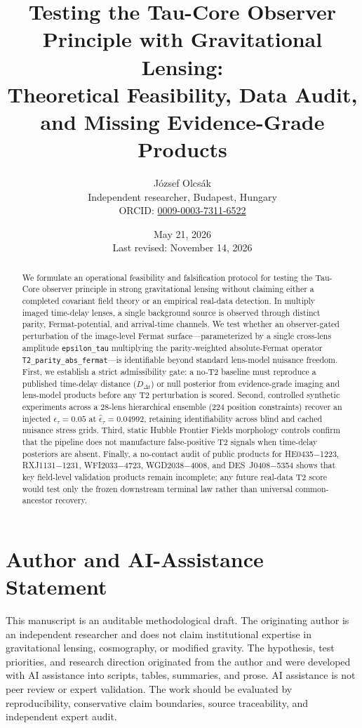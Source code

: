 \documentclass[11pt]{article}
\title{Testing the Tau-Core Observer Principle with Gravitational Lensing:\\
\large Theoretical Feasibility, Data Audit, and Missing Evidence-Grade Products}
\author{J\'ozsef Olcs\'ak\\
\small Independent researcher, Budapest, Hungary\\{\small ORCID: \href{https://orcid.org/0009-0003-7311-6522}{0009-0003-7311-6522}}}
\date{May 21, 2026\\Last revised: November 14, 2026}
\begin{document}
\maketitle

\begin{abstract}
We formulate an operational feasibility and falsification protocol for testing
the Tau-Core observer principle in strong gravitational lensing without claiming
either a completed covariant field theory or an empirical real-data detection.
In multiply imaged time-delay lenses, a single background source is observed
through distinct parity, Fermat-potential, and arrival-time channels. We test
whether an observer-gated perturbation of the image-level Fermat surface---parameterized
by a single cross-lens amplitude \texttt{epsilon\_tau} multiplying the
parity-weighted absolute-Fermat operator \texttt{T2\_parity\_abs\_fermat}---is
identifiable beyond standard lens-model nuisance freedom. First, we establish a
strict admissibility gate: a no-T2 baseline must reproduce a published
time-delay distance ($D_{\Delta t}$) or null posterior from evidence-grade
imaging and lens-model products before any T2 perturbation is scored. Second,
controlled synthetic experiments across a 28-lens hierarchical ensemble (224
position constraints) recover an injected $\epsilon_\tau = 0.05$ at
$\hat{\epsilon}_\tau = 0.04992$, retaining identifiability across blind and
cached nuisance stress grids. Third, static Hubble Frontier Fields morphology
controls confirm that the pipeline does not manufacture false-positive T2
signals when time-delay posteriors are absent. Finally, a no-contact audit of
public products for HE0435$-$1223, RXJ1131$-$1231, WFI2033$-$4723,
WGD2038$-$4008, and DES~J0408$-$5354 shows that key field-level validation
products remain incomplete; any future real-data T2 score would test only the
frozen downstream terminal law rather than universal common-ancestor recovery.
\end{abstract}

\section*{Author and AI-Assistance Statement}\label{author-and-ai-assistance-statement}

This manuscript is an auditable methodological draft. The originating
author is an independent researcher and does not claim institutional
expertise in gravitational lensing, cosmography, or modified gravity.
The hypothesis, test priorities, and research direction originated from
the author and were developed with AI assistance into scripts, tables,
summaries, and prose. AI assistance is not peer review or expert
validation. The work should be evaluated by reproducibility,
conservative claim boundaries, source traceability, and independent
expert audit.
\end{document}
